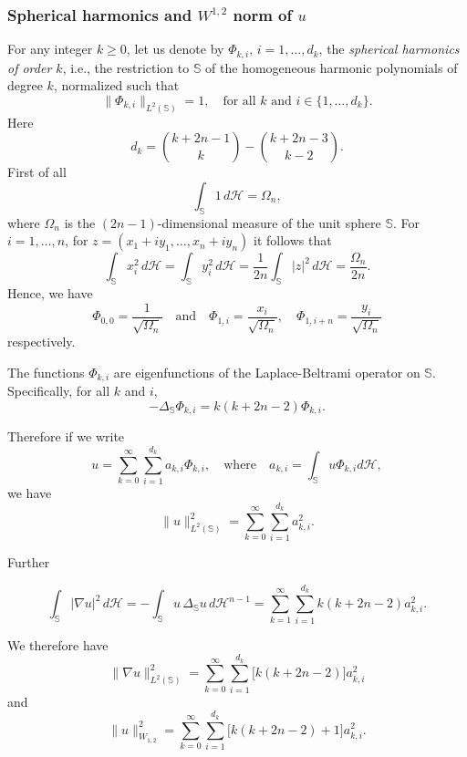 \documentclass[11pt]{amsart}
\numberwithin{equation}{section}
\begin{document}
\subsubsection{Spherical harmonics and $W^{1,2}$ norm of $u$}
For any integer \( k \geq 0 \), let us denote by \( \Phi_{k,i}, \, i = 1, \ldots, d_k \), the \textit{spherical harmonics of order \( k \)}, i.e., the restriction to \( \mathbb{S} \) of the homogeneous harmonic polynomials of degree \( k \), normalized such that
\[
\|\Phi_{k,i}\|_{L^2(\mathbb{S})} = 1, \quad \text{for all } k \text{ and } i \in \{1, \ldots, d_k\}.
\] Here \begin{equation}\label{dimd}
d_k=\binom{k+2n-1}{k}-\binom{k+2n-3}{ k-2}.
\end{equation}
First of all
\[
\int_{\mathbb{S}} 1 \, d\mathcal{H} = \Omega_n,
\]
where \( \Omega_n \) is the \( (2n-1) \)-dimensional measure of the unit sphere \( \mathbb{S} \). For \( i = 1, \ldots, n \), for $z=(x_1+iy_1,\dots, x_n+i y_n)$ it follows that
\[
\int_{\mathbb{S}} x_i^2 \, d\mathcal{H} =\int_{\mathbb{S}} y_i^2 \, d\mathcal{H}= \frac{1}{2n} \int_{\mathbb{S}} |z|^2 \, d\mathcal{H} = \frac{\Omega_n}{2n}.
\]
Hence, we have
\[
\Phi_{0,0} = \frac{1}{\sqrt{\Omega_n}} \quad \text{and} \quad \Phi_{1,i} = \frac{x_i}{\sqrt{\Omega_n}}, \quad \Phi_{1,i+n} = \frac{y_i}{\sqrt{\Omega_n}}
\]
respectively.

The functions \( \Phi_{k,i} \) are eigenfunctions of the Laplace-Beltrami operator on \( \mathbb{S} \). Specifically, for all \( k \) and \( i \),
\[
-\Delta_{\mathbb{S}} \Phi_{k,i} = k(k + 2n - 2) \Phi_{k,i}.
\]

Therefore if we write
\[
u = \sum_{k=0}^\infty \sum_{i=1}^{d_k} a_{k,i} \Phi_{k,i}, \quad \text{where} \quad a_{k,i} = \int_{\mathbb{S}} u \Phi_{k,i} d\mathcal{H},
\]
we have
\[
\|u\|_{L^2(\mathbb{S})}^2 = \sum_{k=0}^\infty \sum_{i=1}^{d_k} a_{k,i}^2.
\]

\bigskip

Further

\[
\int_{\mathbb{S}} |\nabla u|^2 \, d\mathcal{H}
= -\int_{\mathbb{S}} u \, \Delta_{\mathbb{S}} u \, d\mathcal{H}^{n-1}
= \sum_{k=1}^\infty \sum_{i=1}^{d_k} k(k + 2n - 2)a_{k,i}^2.
\]

We therefore have
\begin{equation}\label{ww0}
\|\nabla u\|^2_{L^2 (\mathbb{S})} = \sum_{k=0}^\infty \sum_{i=1}^{d_k} \big[k(k + 2n - 2)\big]a_{k,i}^2
\end{equation} and
\begin{equation}\label{ww}
\|u\|_{W_{1,2}}^2 = \sum_{k=0}^\infty \sum_{i=1}^{d_k} \big[k(k + 2n - 2) + 1\big]a_{k,i}^2.
\end{equation}
\end{document}
